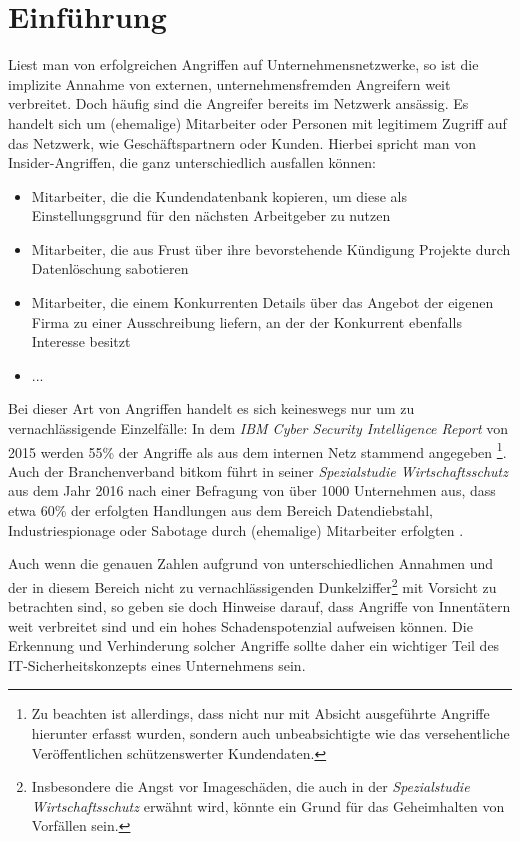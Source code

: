 \chapter{Einführung}

\label{cha_introduction}


Liest man von erfolgreichen Angriffen auf Unternehmensnetzwerke, so ist die implizite Annahme von externen, unternehmensfremden Angreifern weit verbreitet. Doch häufig sind die Angreifer bereits im Netzwerk ansässig. Es handelt sich um (ehemalige) Mitarbeiter oder Personen mit legitimem Zugriff auf das Netzwerk, wie Geschäftspartnern oder Kunden. Hierbei spricht man von Insider-Angriffen, die ganz unterschiedlich ausfallen können:
\begin{itemize}
  \item Mitarbeiter, die die Kundendatenbank kopieren, um diese als Einstellungsgrund für den nächsten Arbeitgeber zu nutzen
  \item Mitarbeiter, die aus Frust über ihre bevorstehende Kündigung Projekte durch Datenlöschung sabotieren
  \item Mitarbeiter, die einem Konkurrenten Details über das Angebot der eigenen Firma zu einer Ausschreibung liefern, an der der Konkurrent ebenfalls Interesse besitzt
  \item ...
\end{itemize}
Bei dieser Art von Angriffen handelt es sich keineswegs nur um zu vernachlässigende Einzelfälle:
In dem \textit{IBM Cyber Security Intelligence Report} von 2015 werden 55\% der Angriffe als aus dem internen Netz stammend angegeben \cite{ibm2015}\footnote{
  Zu beachten ist allerdings, dass nicht nur mit Absicht ausgeführte Angriffe hierunter erfasst wurden, sondern auch unbeabsichtigte wie das versehentliche Veröffentlichen schützenswerter Kundendaten.
}.
Auch der Branchenverband bitkom führt in seiner \textit{Spezialstudie Wirtschaftsschutz} aus dem Jahr 2016 nach einer Befragung von über 1000 Unternehmen aus, dass etwa 60\% der erfolgten Handlungen aus dem Bereich Datendiebstahl, Industriespionage oder Sabotage durch (ehemalige) Mitarbeiter erfolgten \cite{bitkom2016}.

Auch wenn die genauen Zahlen aufgrund von unterschiedlichen Annahmen und der in diesem Bereich nicht zu vernachlässigenden Dunkelziffer\footnote{
	Insbesondere die Angst vor Imageschäden, die auch in der \textit{Spezialstudie Wirtschaftsschutz} erwähnt wird, könnte ein Grund für das Geheimhalten von Vorfällen sein.
} mit Vorsicht zu betrachten sind, so geben sie doch Hinweise darauf, dass Angriffe von Innentätern weit verbreitet sind und ein hohes Schadenspotenzial aufweisen können. Die Erkennung und Verhinderung solcher Angriffe sollte daher ein wichtiger Teil des IT-Sicherheitskonzepts eines Unternehmens sein.

